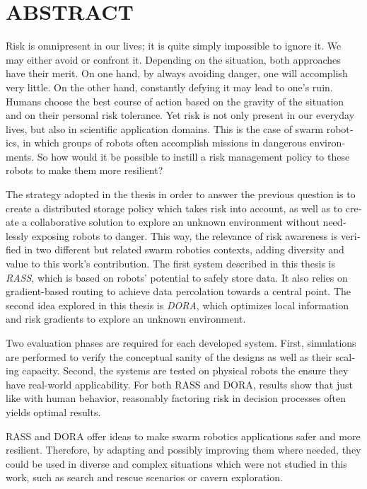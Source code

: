 %

\chapter*{ABSTRACT}\thispagestyle{headings}
%
\begin{otherlanguage}{english}
Risk is omnipresent in our lives; it is quite simply impossible to ignore it. We may either avoid or confront it. Depending on the situation, both approaches have their merit. On one hand, by always avoiding danger, one will accomplish very little. On the other hand, constantly defying it may lead to one's ruin. Humans choose the best course of action based on the gravity of the situation and on their personal risk tolerance. Yet risk is not only present in our everyday lives, but also in scientific application domains. This is the case of swarm robotics, in which groups of robots often accomplish missions in dangerous environments. So how would it be possible to instill a risk management policy to these robots to make them more resilient?

The strategy adopted in the thesis in order to answer the previous question is to create a distributed storage policy which takes risk into account, as well as to create a collaborative solution to explore an unknown environment without needlessly exposing robots to danger. This way, the relevance of risk awareness is verified in two different but related swarm robotics contexts, adding diversity and value to this work's contribution. The first system described in this thesis is \textit{\acl{RASS}}, which is based on robots' potential to safely store data. It also relies on gradient-based routing to achieve data percolation towards a central point. The second idea explored in this thesis is \textit{\acl{DORA}}, which optimizes local information and risk gradients to explore an unknown environment.

Two evaluation phases are required for each developed system. First, simulations are performed to verify the conceptual sanity of the designs as well as their scaling capacity. Second, the systems are tested on physical robots the ensure they have real-world applicability. For both \ac{RASS} and \ac{DORA}, results show that just like with human behavior, reasonably factoring risk in decision processes often yields optimal results.

\ac{RASS} and \ac{DORA} offer ideas to make swarm robotics applications safer and more resilient. Therefore, by adapting and possibly improving them where needed, they could be used in diverse and complex situations which were not studied in this work, such as search and rescue scenarios or cavern exploration.

\end{otherlanguage}
